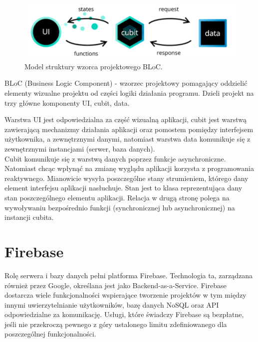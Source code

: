 \begin{figure}[h!]
	\begin{center}
		\includegraphics[width=1\textwidth]{img/cubit.png}
	\end{center}
	\caption{{\color{dgray}Model struktury wzorca projektowego BLoC.}} 
	\label{struktura_BLoC}
\end{figure}  

BLoC (Business Logic Component) - wzorzec projektowy pomagający oddzielić elementy wizualne projektu od części logiki działania programu. Dzieli projekt na trzy główne komponenty UI, cubit, data.

Warstwa UI jest odpowiedzialna za część wizualną aplikacji, cubit jest warstwą zawierającą mechanizmy działania aplikacji oraz pomostem pomiędzy interfejsem użytkownika, a zewnętrznymi danymi, natomiast warstwa data komunikuje się z zewnętrznymi instancjami (serwer, baza danych).\\

Cubit komunikuje się z warstwą danych poprzez funkcje asynchroniczne. Natomiast chcąc wpłynąć na zmianę wyglądu aplikacji korzysta z programowania reaktywnego. Mianowicie wysyła poszczególne stany strumieniem, którego dany element interfejsu aplikacji nasłuchuje. Stan jest to klasa reprezentująca dany stan poszczególnego elementu aplikacji. Relacja w drugą stronę polega na wywoływaniu bezpośrednio funkcji (synchronicznej lub asynchronicznej) na instancji cubita.

\section{Firebase}

Rolę serwera i bazy danych pełni platforma Firebase. Technologia ta, zarządzana również przez Google, określana jest jako Backend-as-a-Service. Firebase dostarcza wiele funkcjonalności
wspierające tworzenie projektów w tym między innymi uwierzytelnianie użytkowników, bazę danych NoSQL oraz API odpowiedzialne za komunikację. Usługi, które świadczy Firebase są bezpłatne, jeśli nie przekroczą pewnego z góry ustalonego limitu zdefiniowanego dla poszczególnej funkcjonalności. 

